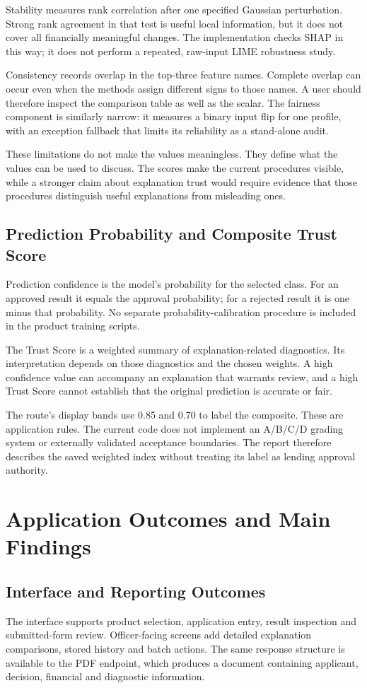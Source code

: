 Stability measures rank correlation after one specified Gaussian perturbation. Strong rank agreement in that test is useful local information, but it does not cover all financially meaningful changes. The implementation checks SHAP in this way; it does not perform a repeated, raw-input LIME robustness study.

Consistency records overlap in the top-three feature names. Complete overlap can occur even when the methods assign different signs to those names. A user should therefore inspect the comparison table as well as the scalar. The fairness component is similarly narrow: it measures a binary input flip for one profile, with an exception fallback that limits its reliability as a stand-alone audit.

These limitations do not make the values meaningless. They define what the values can be used to discuss. The scores make the current procedures visible, while a stronger claim about explanation trust would require evidence that those procedures distinguish useful explanations from misleading ones.

\subsection{Prediction Probability and Composite Trust Score}
Prediction confidence is the model's probability for the selected class. For an approved result it equals the approval probability; for a rejected result it is one minus that probability. No separate probability-calibration procedure is included in the product training scripts.

The Trust Score is a weighted summary of explanation-related diagnostics. Its interpretation depends on those diagnostics and the chosen weights. A high confidence value can accompany an explanation that warrants review, and a high Trust Score cannot establish that the original prediction is accurate or fair.

The route's display bands use 0.85 and 0.70 to label the composite. These are application rules. The current code does not implement an A/B/C/D grading system or externally validated acceptance boundaries. The report therefore describes the saved weighted index without treating its label as lending approval authority.

\section{Application Outcomes and Main Findings}
\subsection{Interface and Reporting Outcomes}
The interface supports product selection, application entry, result inspection and submitted-form review. Officer-facing screens add detailed explanation comparisons, stored history and batch actions. The same response structure is available to the PDF endpoint, which produces a document containing applicant, decision, financial and diagnostic information.

